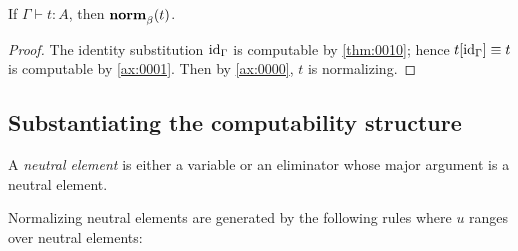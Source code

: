 \documentclass[a4paper]{article}
\begin{document}
\begin{theorem}[Normalization]\label{thm:0000}
  If $\Gamma \vdash t : A$, then $\operatorname{\mathbf{norm}}^{}_{\beta}(t)$.
\end{theorem}
\begin{proof}
  The identity substitution $\mathrm{id}_{\Gamma}$ is computable by \cref{thm:0010}; hence $t[\mathrm{id}_{\Gamma}] \equiv t$ is computable by \cref{ax:0001}.
  Then by \cref{ax:0000}, $t$ is normalizing.
\end{proof}

\subsection{Substantiating the computability structure}
\label{sec:0008}

\begin{definition}
  A \emph{neutral element} is either a variable or an eliminator whose major argument is a neutral element.
\end{definition}

\begin{construction}
  Normalizing neutral elements are generated by the following rules where $u$ ranges over neutral elements:
\end{construction}
\end{document}
